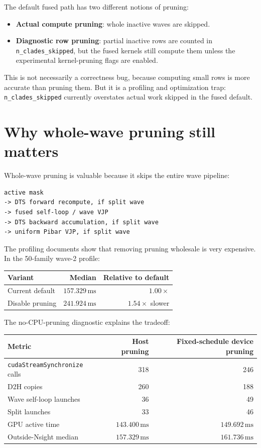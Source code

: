 \documentclass[11pt]{article}
\newcommand{\ms}{\,\mathrm{ms}}
\newcommand{\code}[1]{\texttt{#1}}
\begin{document}
The default fused path has two different notions of pruning:

\begin{itemize}[leftmargin=*]
\item \textbf{Actual compute pruning}: whole inactive waves are skipped.
\item \textbf{Diagnostic row pruning}: partial inactive rows are counted in
      \code{n\_clades\_skipped}, but the fused kernels still compute them unless
      the experimental kernel-pruning flags are enabled.
\end{itemize}

This is not necessarily a correctness bug, because computing small rows is more
accurate than pruning them.  But it is a profiling and optimization trap:
\code{n\_clades\_skipped} currently overstates actual work skipped in the fused
default.

\section{Why whole-wave pruning still matters}

Whole-wave pruning is valuable because it skips the entire wave pipeline:

\begin{lstlisting}
active mask
-> DTS forward recompute, if split wave
-> fused self-loop / wave VJP
-> DTS backward accumulation, if split wave
-> uniform Pibar VJP, if split wave
\end{lstlisting}

The profiling documents show that removing pruning wholesale is very expensive.
In the 50-family wave-2 profile:

\begin{center}
\begin{tabular}{lrr}
\toprule
Variant & Median & Relative to default \\
\midrule
Current default & $157.329\ms$ & $1.00\times$ \\
Disable pruning & $241.924\ms$ & $1.54\times$ slower \\
\bottomrule
\end{tabular}
\end{center}

The no-CPU-pruning diagnostic explains the tradeoff:

\begin{center}
\begin{tabular}{lrr}
\toprule
Metric & Host pruning & Fixed-schedule device pruning \\
\midrule
\code{cudaStreamSynchronize} calls & 318 & 246 \\
D2H copies & 260 & 188 \\
Wave self-loop launches & 36 & 49 \\
Split launches & 33 & 46 \\
GPU active time & $143.400\ms$ & $149.692\ms$ \\
Outside-Nsight median & $157.329\ms$ & $161.736\ms$ \\
\bottomrule
\end{tabular}
\end{center}
\end{document}
